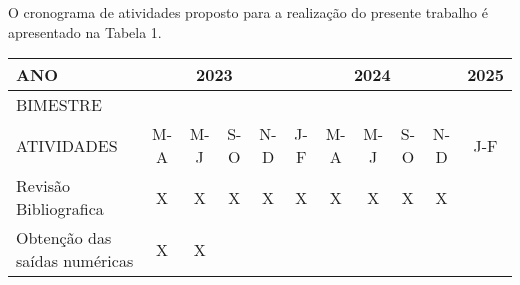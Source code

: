 \documentclass[portuguese,12pt,a4paper]{article}
\begin{document}
O cronograma de atividades proposto para a realização do presente trabalho é
apresentado na Tabela 1. 
\begin{table}[H]

	\centering

	\begin{adjustbox}{width=1\textwidth}

	\begin{tabular}{|l|cccc|ccccc|c|}
		\hline
		ANO                            & \multicolumn{4}{c|}{2023}                                                                                                                                                & \multicolumn{5}{c|}{2024}                                                                                                                                                                                 & 2025                  \\ \hline
		BIMESTRE                       & \multicolumn{1}{c|}{}                          & \multicolumn{1}{c|}{}                          & \multicolumn{1}{c|}{}                          &                       & \multicolumn{1}{c|}{}                      & \multicolumn{1}{c|}{}                      & \multicolumn{1}{c|}{}                      & \multicolumn{1}{c|}{}                      &                       &                       \\ \cline{1-1}
		ATIVIDADES                     & \multicolumn{1}{c|}{\multirow{-2}{*}{M-A}}     & \multicolumn{1}{c|}{\multirow{-2}{*}{M-J}}     & \multicolumn{1}{c|}{\multirow{-2}{*}{S-O}}     & \multirow{-2}{*}{N-D} & \multicolumn{1}{c|}{\multirow{-2}{*}{J-F}} & \multicolumn{1}{c|}{\multirow{-2}{*}{M-A}} & \multicolumn{1}{c|}{\multirow{-2}{*}{M-J}} & \multicolumn{1}{c|}{\multirow{-2}{*}{S-O}} & \multirow{-2}{*}{N-D} & \multirow{-2}{*}{J-F} \\ \hline
		Revisão Bibliografica          & \multicolumn{1}{c|}{\cellcolor[HTML]{9B9B9B}X} & \multicolumn{1}{c|}{\cellcolor[HTML]{9B9B9B}X} & \multicolumn{1}{c|}{\cellcolor[HTML]{C0C0C0}X} & X                     & \multicolumn{1}{c|}{X}                     & \multicolumn{1}{c|}{X}                     & \multicolumn{1}{c|}{X}                     & \multicolumn{1}{c|}{X}                     & X                     &                       \\ \hline
		Obtenção das saídas numéricas  & \multicolumn{1}{c|}{\cellcolor[HTML]{9B9B9B}X} & \multicolumn{1}{c|}{\cellcolor[HTML]{9B9B9B}X} & \multicolumn{1}{c|}{}                          &                       & \multicolumn{1}{c|}{}                      & \multicolumn{1}{c|}{}                      & \multicolumn{1}{c|}{}                      & \multicolumn{1}{c|}{}                      &                       &                       \\ \hline

\end{tabular}
\end{adjustbox}
\end{table}
\end{document}
